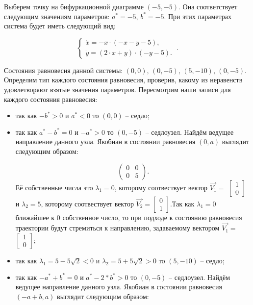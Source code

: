 Выберем точку на бифуркационной диаграмме $(-5, -5)$. Она соответствует следующим значениям параметров:  $a^\ast = -5$, $b^\ast = -5$. При этих параметрах система будет иметь следующий вид: 

$$
\left \lbrace 
\begin{matrix} 
	\dot{x} = -x \cdot (-x - y - 5), \\
	\dot{y} = (2 \cdot x + y) \cdot (-y - 5). \
\end{matrix} 
\right . .$$

Состояния равновесия данной системы: $(0, 0)$, $(0, -5)$, $(5, -10)$, $(0, -5)$. Определим тип каждого состояния равновесия, проверив, какому из неравенств удовлетворяют взятые значения параметров.  Пересмотрим наши записи для каждого состояния равновесия: 
\begin{itemize}
	\item{ так как $-b^\ast > 0 $ и $a^\ast  < 0 $ то $(0, 0)$ -- седло;}
	\item{ так как $a^\ast - b^\ast = 0 $ и $-a^\ast > 0 $ то $(0, -5)$ -- седлоузел. Найдём ведущее направление данного узла. Якобиан в состоянии равновесия $(0, a)$ выглядит следующим образом:
		
		$$\begin{pmatrix}0 & 0\\0 & 5\end{pmatrix}. $$Её собственные числа это $\lambda_1=0$, которому соотвествует вектор $\Vec{V_1}=$ $\left[\begin{matrix}1\\0\end{matrix}\right]$ и $\lambda_2=5$, которому соотвествует вектор $\Vec{V_2}=$$\left[\begin{matrix}0\\1\end{matrix}\right]$.Так как $\lambda_1=0$ ближайшее к $0$ собственное число, то при подходе к состоянию равновесия траектории будут стремиться к направлению, задаваемому вектором $\Vec{V_1}=$ $\left[\begin{matrix}1\\0\end{matrix}\right]$;}
	\item{ так как ${\lambda_{1}} = 5 - 5 \sqrt{2}$$  < 0 $ и ${\lambda_{2}} = 5 + 5 \sqrt{2}$$ > 0 $ то $(5, -10)$ -- седло;}
	\item{ так как $-a^\ast + b^\ast = 0 $ и $a^\ast - 2*b^\ast > 0 $ то $(0, -5)$ -- седлоузел. Найдём ведущее направление данного узла. Якобиан в состоянии равновесия $(-a + b, a)$ выглядит следующим образом:
		
}
\end{itemize}
